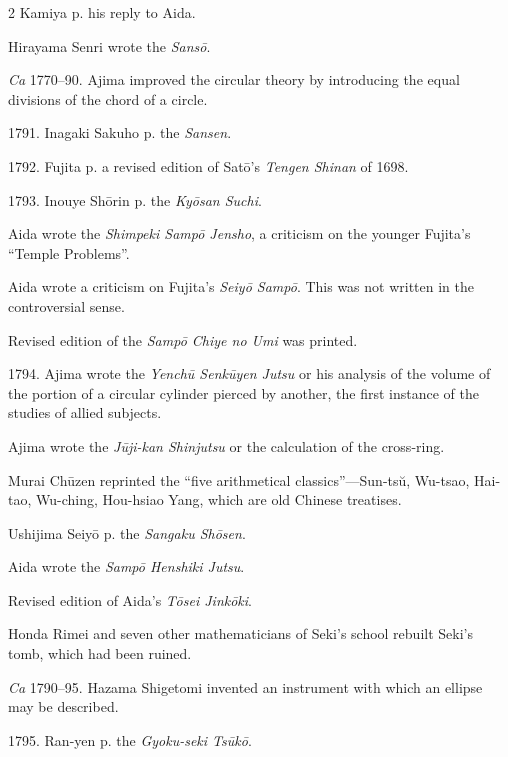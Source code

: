 \documentclass[11pt]{article}
\newcommand{\scanfooter}{}
\begin{document}
\begin{multicols}{2}
Kamiya p. his reply to Aida.

Hirayama Senri wrote the \emph{Sansō}.

\emph{Ca} 1770--90. Ajima improved the circular theory by introducing the equal divisions of the chord of a circle.

1791. Inagaki Sakuho p. the \emph{Sansen}.

1792. Fujita p. a revised edition of Satō's \emph{Tengen Shinan} of 1698.

1793. Inouye Shōrin p. the \emph{Kyōsan Suchi}.

Aida wrote the \emph{Shimpeki Sampō Jensho}, a criticism on the younger Fujita's ``Temple Problems''.

Aida wrote a criticism on Fujita's \emph{Seiyō Sampō}. This was not written in the controversial sense.

Revised edition of the \emph{Sampō Chiye no Umi} was printed.

1794. Ajima wrote the \emph{Yenchū Senkūyen Jutsu} or his analysis of the volume of the portion of a circular cylinder pierced by another, the first instance of the studies of allied subjects.

Ajima wrote the \emph{Jūji-kan Shinjutsu} or the calculation of the cross-ring.

Murai Chūzen reprinted the ``five arithmetical classics''---Sun-tsŭ, Wu-tsao, Hai-tao, Wu-ching, Hou-hsiao Yang, which are old Chinese treatises.

Ushijima Seiyō p. the \emph{Sangaku Shōsen}.

Aida wrote the \emph{Sampō Henshiki Jutsu}.

Revised edition of Aida's \emph{Tōsei Jinkōki}.

Honda Rimei and seven other mathematicians of Seki's school rebuilt Seki's tomb, which had been ruined.

\emph{Ca} 1790--95. Hazama Shigetomi invented an instrument with which an ellipse may be described.

1795. Ran-yen p. the \emph{Gyoku-seki Tsūkō}.
\end{multicols}
\scanfooter
\end{document}
